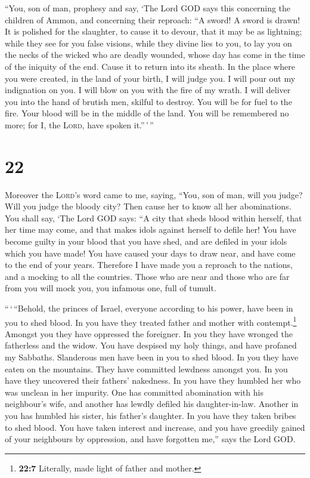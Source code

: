  ``You, son of man, prophesy and say, `The Lord GOD says
this concerning the children of Ammon, and concerning their reproach:
``A sword! A sword is drawn! It is polished for the slaughter, to cause
it to devour, that it may be as lightning;  while they
see for you false visions, while they divine lies to you, to lay you on
the necks of the wicked who are deadly wounded, whose day has come in
the time of the iniquity of the end.  Cause it to return
into its sheath. In the place where you were created, in the land of
your birth, I will judge you.  I will pour out my
indignation on you. I will blow on you with the fire of my wrath. I will
deliver you into the hand of brutish men, skilful to destroy.
 You will be for fuel to the fire. Your blood will be in
the middle of the land. You will be remembered no more; for I, the
\textsc{Lord}, have spoken it.''\,'\,''

\hypertarget{section-21}{%
\section{22}\label{section-21}}

 Moreover the \textsc{Lord}'s word came to me, saying,
 ``You, son of man, will you judge? Will you judge the
bloody city? Then cause her to know all her abominations. 
You shall say, `The Lord GOD says: ``A city that sheds blood within
herself, that her time may come, and that makes idols against herself to
defile her!  You have become guilty in your blood that you
have shed, and are defiled in your idols which you have made! You have
caused your days to draw near, and have come to the end of your years.
Therefore I have made you a reproach to the nations, and a mocking to
all the countries.  Those who are near and those who are
far from you will mock you, you infamous one, full of tumult.

 ``\,`\,``Behold, the princes of Israel, everyone
according to his power, have been in you to shed blood. 
In you have they treated father and mother with contempt.\footnote{\textbf{22:7}
  Literally, made light of father and mother.} Amongst you they have
oppressed the foreigner. In you they have wronged the fatherless and the
widow.  You have despised my holy things, and have
profaned my Sabbaths.  Slanderous men have been in you to
shed blood. In you they have eaten on the mountains. They have committed
lewdness amongst you.  In you have they uncovered their
fathers' nakedness. In you have they humbled her who was unclean in her
impurity.  One has committed abomination with his
neighbour's wife, and another has lewdly defiled his daughter-in-law.
Another in you has humbled his sister, his father's daughter.
 In you have they taken bribes to shed blood. You have
taken interest and increase, and you have greedily gained of your
neighbours by oppression, and have forgotten me,'' says the Lord GOD.

